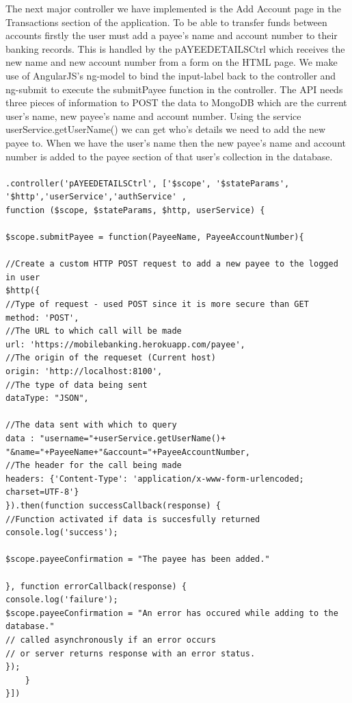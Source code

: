 The next major controller we have implemented is the Add Account page in the Transactions section of the application. To be able to transfer funds between accounts firstly the user must add a payee’s name and account number to their banking records. This is handled by the pAYEEDETAILSCtrl which receives the new name and new account number from a form on the HTML page. We make use of AngularJS’s ng-model to bind the input-label back to the controller and ng-submit to execute the submitPayee function in the controller. The API needs three pieces of information to POST the data to MongoDB which are the current user’s name, new payee’s name and account number. Using the service userService.getUserName() we can get who’s details we need to add the new payee to. When we have the user’s name then the new payee’s name and account number is added to the payee section of that user’s collection in the database.\paragraph{}
\begin{verbatim}
.controller('pAYEEDETAILSCtrl', ['$scope', '$stateParams',
'$http','userService','authService' ,
function ($scope, $stateParams, $http, userService) {

$scope.submitPayee = function(PayeeName, PayeeAccountNumber){

//Create a custom HTTP POST request to add a new payee to the logged in user
$http({
//Type of request - used POST since it is more secure than GET
method: 'POST',
//The URL to which call will be made
url: 'https://mobilebanking.herokuapp.com/payee',
//The origin of the requeset (Current host)
origin: 'http://localhost:8100',
//The type of data being sent
dataType: "JSON",

//The data sent with which to query
data : "username="+userService.getUserName()+
"&name="+PayeeName+"&account="+PayeeAccountNumber,
//The header for the call being made
headers: {'Content-Type': 'application/x-www-form-urlencoded; charset=UTF-8'}
}).then(function successCallback(response) {
//Function activated if data is succesfully returned
console.log('success');

$scope.payeeConfirmation = "The payee has been added."

}, function errorCallback(response) {
console.log('failure');
$scope.payeeConfirmation = "An error has occured while adding to the database."
// called asynchronously if an error occurs
// or server returns response with an error status.
});
    }
}])
\end{verbatim}

